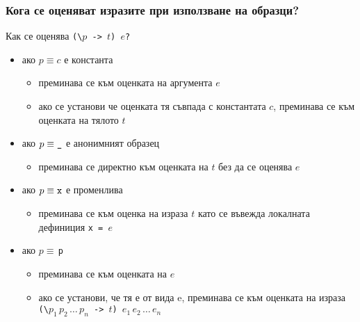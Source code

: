 \documentclass{beamer}
\begin{document}
\begin{frame}
  \frametitle{Кога се оценяват изразите при използване на образци?}

  Как се оценява \tt{(\textbackslash $p$ -> $t$) $e$}?\pause
  \begin{itemize}[<+->]
  \item ако $p \equiv c$ е константа
    \begin{itemize}
    \item преминава се към оценката на аргумента $e$
    \item ако се установи че оценката тя съвпада с константата $c$, преминава се към оценката на тялото $t$
    \end{itemize}
  \item ако $p \equiv \tt\_$ е анонимният образец
    \begin{itemize}
    \item преминава се директно към оценката на $t$ \alert{без да се оценява $e$}
    \end{itemize}
  \item ако $p \equiv \tt x$ е променлива
    \begin{itemize}
    \item преминава се към оценка на израза $t$ \alert{като се въвежда локалната дефиниция \tt{x = $e$}}
    \end{itemize}
  \item ако \tt{$p \equiv\,$\tuple p}
    \begin{itemize}
    \item преминава се към оценката на $e$
    \item ако се установи, че тя е от вида \tuple e, преминава се към оценката на израза \tt{(\textbackslash $p_1\,p_2\,\ldots\,p_n$ -> $t$) $e_1\,e_2\,\ldots\,e_n$}
    \end{itemize}
  \end{itemize}
\end{frame}
\end{document}
